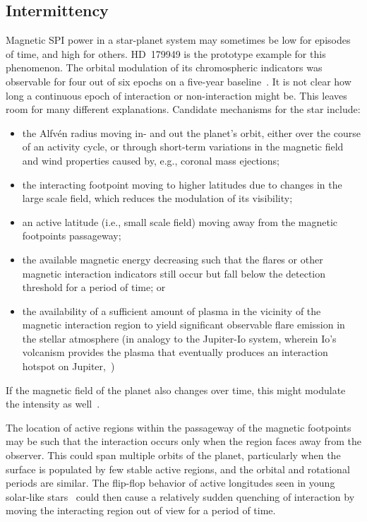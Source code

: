 \documentclass[twocolumn]{aastex631}
\begin{document}
\subsection{Intermittency}
\label{sec:discussion:intermittency}
Magnetic SPI power in a star-planet system may sometimes be low for episodes of time, and high for others. HD~179949 is the prototype example for this phenomenon. The orbital modulation of its chromospheric indicators was observable for four out of six epochs on a five-year baseline~\citep{shkolnik2003evidence,shkolnik2008nature}. It is not clear how long a continuous epoch of interaction or non-interaction might be. This leaves room for many different explanations. Candidate mechanisms for the star include: 
\begin{itemize}
    \item the Alfv\'en radius moving in- and out the planet's orbit, either over the course of an activity cycle, or through short-term variations in the magnetic field and wind properties caused by, e.g., coronal mass ejections;
    \item the interacting footpoint moving to higher latitudes due to changes in the large scale field, which reduces the modulation of its visibility; 
    \item an active latitude (i.e., small scale field) moving away from the magnetic footpoints passageway;
    \item the available magnetic energy decreasing such that the flares or other magnetic interaction indicators still occur but fall below the detection threshold for a period of time; or
    \item the availability of a sufficient amount of plasma in the vicinity of the magnetic interaction region to yield significant observable flare emission in the stellar atmosphere (in analogy to the Jupiter-Io system, wherein Io's volcanism provides the plasma that eventually produces an interaction hotspot on Jupiter,~\citealt{clarke1996farultraviolet, prange1996rapid})
\end{itemize}

If the magnetic field of the planet also changes over time, this might modulate the intensity as well~\citep[e.g.][]{turnpenney2018exoplanetinduced}.

The location of active regions within the passageway of the magnetic footpoints may be such that the interaction occurs only when the region faces away from the observer. This could span multiple orbits of the planet, particularly when the surface is populated by few stable active regions, and the orbital and rotational periods are similar. The flip-flop behavior of active longitudes seen in young solar-like stars~\citep{berdyugina2005starspots} could then cause a relatively sudden quenching of interaction by moving the interacting region out of view for a period of time. 
\end{document}

